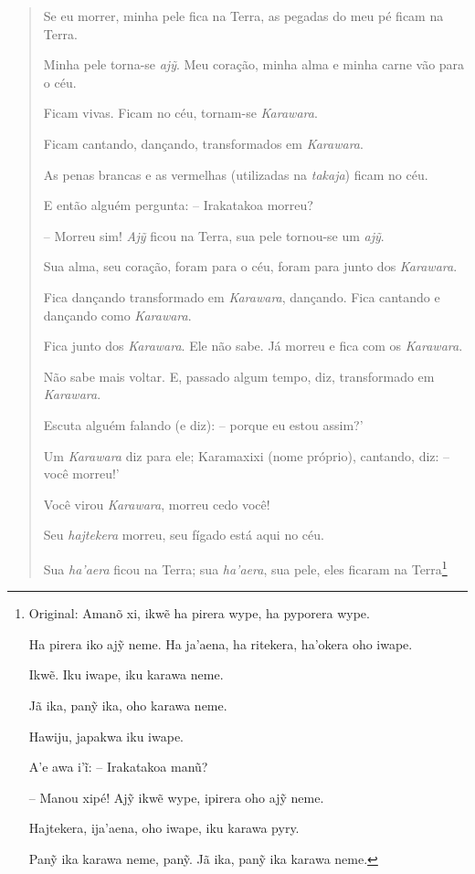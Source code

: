 \begin{quote}
Se eu morrer, minha pele fica na Terra, as pegadas do meu pé ficam na
Terra.

Minha pele torna-se \emph{ajỹ}. Meu coração, minha alma e minha carne
vão para o céu.

Ficam vivas. Ficam no céu, tornam-se \emph{Karawara}.

Ficam cantando, dançando, transformados em \emph{Karawara}.

As penas brancas e as vermelhas (utilizadas na \emph{takaja}) ficam no
céu.

E então alguém pergunta: -- Irakatakoa morreu?

-- Morreu sim! \emph{Ajỹ} ficou na Terra, sua pele tornou-se um
\emph{ajỹ}.

Sua alma, seu coração, foram para o céu, foram para junto dos
\emph{Karawara}.

Fica dançando transformado em \emph{Karawara}, dançando. Fica cantando e
dançando como \emph{Karawara}.

Fica junto dos \emph{Karawara}. Ele não sabe. Já morreu e fica com os
\emph{Karawara}.

Não sabe mais voltar. E, passado algum tempo, diz, transformado em
\emph{Karawara}.

Escuta alguém falando (e diz): -- porque eu estou assim?'

Um \emph{Karawara} diz para ele; Karamaxixi (nome próprio), cantando,
diz: -- você morreu!'

Você virou \emph{Karawara}, morreu cedo você!

Seu \emph{hajtekera} morreu, seu fígado está aqui no céu.

Sua \emph{ha'aera} ficou na Terra; sua \emph{ha'aera}, sua pele, eles
ficaram na Terra\footnote{Original: Amanõ xi, ikwẽ ha pirera wype, ha
  pyporera wype.

  Ha pirera iko ajỹ neme. Ha ja'aena, ha ritekera, ha'okera oho iwape.

  Ikwẽ. Iku iwape, iku karawa neme.

  Jã ika, panỹ ika, oho karawa neme.

  Hawiju, japakwa iku iwape.

  A'e awa i'ĩ: -- Irakatakoa manũ?

  -- Manou xipé! Ajỹ ikwẽ wype, ipirera oho ajỹ neme.

  Hajtekera, ija'aena, oho iwape, iku karawa pyry.

  Panỹ ika karawa neme, panỹ. Jã ika, panỹ ika karawa neme.

}
\end{quote}
